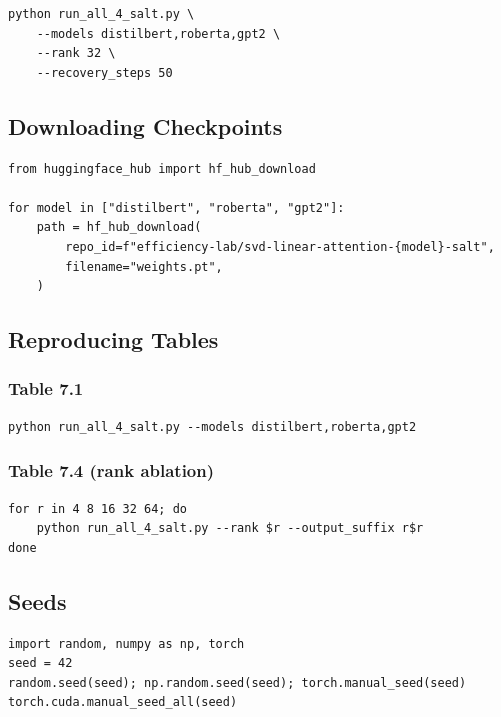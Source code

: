\begin{lstlisting}
python run_all_4_salt.py \
    --models distilbert,roberta,gpt2 \
    --rank 32 \
    --recovery_steps 50
\end{lstlisting}

\subsection{Downloading Checkpoints}

\begin{lstlisting}
from huggingface_hub import hf_hub_download

for model in ["distilbert", "roberta", "gpt2"]:
    path = hf_hub_download(
        repo_id=f"efficiency-lab/svd-linear-attention-{model}-salt",
        filename="weights.pt",
    )
\end{lstlisting}

\subsection{Reproducing Tables}

\subsubsection{Table 7.1}

\begin{lstlisting}
python run_all_4_salt.py --models distilbert,roberta,gpt2
\end{lstlisting}

\subsubsection{Table 7.4 (rank ablation)}

\begin{lstlisting}
for r in 4 8 16 32 64; do
    python run_all_4_salt.py --rank $r --output_suffix r$r
done
\end{lstlisting}

\subsection{Seeds}

\begin{lstlisting}
import random, numpy as np, torch
seed = 42
random.seed(seed); np.random.seed(seed); torch.manual_seed(seed)
torch.cuda.manual_seed_all(seed)
\end{lstlisting}

